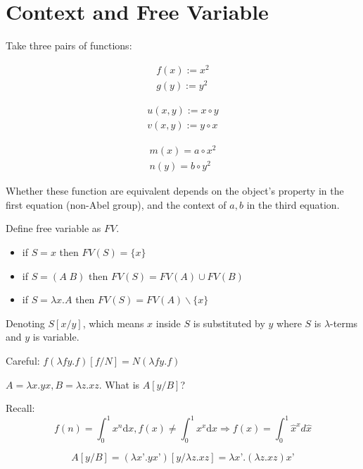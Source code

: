 \section{Context and Free
Variable}

Take three pairs of functions:

\begin{align*}
f(x):= x^2 \\
g(y):= y^2
\end{align*}

\begin{align*}
u(x,y):= x\circ y \\
v(x,y):= y \circ x
\end{align*}

\begin{align*}
m(x)=a\circ x^2\\
n(y) = b \circ y^2
\end{align*}

Whether these function are equivalent depends on the object's property in the first equation (non-Abel group),
and the context of \(a,b\) in the third equation.

\textbf{}




\begin{definition} Define free variable as $FV$.
\begin{itemize}
\item
  if \(S = x\) then \(FV(S) = \{x\}\)
\item
  if \(S = (A\;B)\) then \(FV(S)=FV(A) \cup FV(B)\)
\item
  if \(S = \lambda x.A\) then \(FV(S)=FV(A) \backslash \{x\}\)
\end{itemize}
\end{definition}

\begin{definition}[Substitution]
Denoting \(S[x/y]\), which means $x$ inside $S$ is substituted by $y$ where $S$ is \(\lambda\)-terms and \(y\) is variable.
\end{definition}
\begin{remark}
Careful: \(f(\lambda fy.f)[f/N] = N(\lambda fy.f)\)
\end{remark}

\begin{example}
\(A=\lambda x.y x, B=\lambda z.xz\). What is \(A[y/B]\)?

Recall:
$$f(n)=\int_0^1x^n\mathrm{d}x, f(x) \neq \int_0^1x^x\mathrm{d}x \Rightarrow f(x) = \int_0^1\hat{x}^xd\hat{x}$$

$$A[y/B] = (\lambda x’.yx’)[y/\lambda z.xz]=\lambda x’.(\lambda z.xz)x’$$
\end{example}


